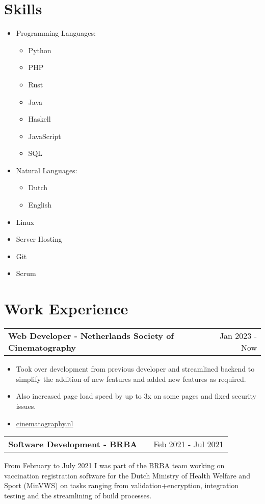 \documentclass[a4paper,12pt]{article}
\makeatletter
\newenvironment{jobshort}[2]
    {
    \begin{tabularx}{\linewidth}{@{}l X r@{}}
    \textbf{#1} & \hfill &  #2 \\[3.75pt]
    \end{tabularx}
    }
    {
    }
\newenvironment{joblong}[2]
    {
    \begin{tabularx}{\linewidth}{@{}l X r@{}}
    \textbf{#1} & \hfill &  #2 \\[3.75pt]
    \end{tabularx}
    \begin{minipage}[t]{\linewidth}
    \begin{itemize}[nosep,after=\strut, leftmargin=1em, itemsep=3pt,label=--]
    }
    {
    \end{itemize}
    \end{minipage}    
    }
\makeatother
\begin{document}
\section{Skills}
\begin{multicols}{2}
\begin{itemize}
    \item Programming Languages:
        \begin{itemize}
            \item Python
            \item PHP
            \item Rust
            \item Java
            \item Haskell
            \item JavaScript
            \item SQL
        \end{itemize}
    \item Natural Languages:
        \begin{itemize}
            \item Dutch
            \item English
        \end{itemize}
    \item Linux
    \item Server Hosting
    \item Git
    \item Scrum
\end{itemize}
\end{multicols}

\section{Work Experience}

\begin{joblong}{Web Developer - Netherlands Society of Cinematography}{Jan 2023 - Now}
\item Took over development from previous developer and streamlined backend to simplify the addition of new features and added new features as required.
\item Also increased page load speed by up to 3x on some pages and fixed security issues.
\item \href{https://cinematography.nl}{cinematography.nl}
\end{joblong}

\begin{jobshort}{Software Development - BRBA}{Feb 2021 - Jul 2021}
From February to July 2021 I was part of the \href{https://www.ronroozendaal.nl/blog/2021/05/een-nieuw-registratiesysteem-in-een-paar-weken-tijd}{BRBA} team working on vaccination registration software for the Dutch Ministry of Health Welfare and Sport (MinVWS) on tasks ranging from validation+encryption, integration testing and the streamlining of build processes.
\end{jobshort}
\end{document}
